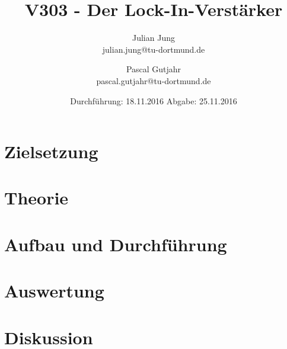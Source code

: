 

\title{V303 - Der Lock-In-Verstärker}
\author{Julian Jung \\ julian.jung@tu-dortmund.de
  \and Pascal Gutjahr \\ pascal.gutjahr@tu-dortmund.de}
  \date{Durchführung: 18.11.2016
  \hspace{3em}
  Abgabe: 25.11.2016}
  
\maketitle
\newpage
\tableofcontents
\newpage
\section{Zielsetzung}
\section{Theorie}
% 
\section{Aufbau und Durchführung}
% 
\section{Auswertung}
% 
\section{Diskussion}
% 
\printbibliography


